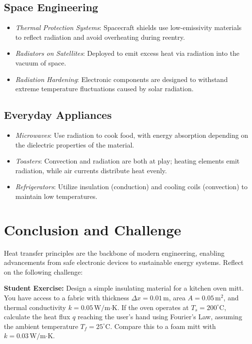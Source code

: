 \documentclass[12pt]{article}
\begin{document}
\subsection*{Space Engineering}
\begin{itemize}
    \item \textit{Thermal Protection Systems}: Spacecraft shields use low-emissivity materials to reflect radiation and avoid overheating during reentry.
    \item \textit{Radiators on Satellites}: Deployed to emit excess heat via radiation into the vacuum of space.
    \item \textit{Radiation Hardening}: Electronic components are designed to withstand extreme temperature fluctuations caused by solar radiation.
\end{itemize}

\subsection*{Everyday Appliances}
\begin{itemize}
    \item \textit{Microwaves}: Use radiation to cook food, with energy absorption depending on the dielectric properties of the material.
    \item \textit{Toasters}: Convection and radiation are both at play; heating elements emit radiation, while air currents distribute heat evenly.
    \item \textit{Refrigerators}: Utilize insulation (conduction) and cooling coils (convection) to maintain low temperatures.
\end{itemize}

\section*{Conclusion and Challenge}
Heat transfer principles are the backbone of modern engineering, enabling advancements from safe electronic devices to sustainable energy systems. Reflect on the following challenge: 

\textbf{Student Exercise:}
Design a simple insulating material for a kitchen oven mitt. You have access to a fabric with thickness $ \Delta x = 0.01 \, \text{m} $, area $ A = 0.05 \, \text{m}^2 $, and thermal conductivity $ k = 0.05 \, \text{W/m·K} $. If the oven operates at $ T_s = 200^\circ \text{C} $, calculate the heat flux $ q $ reaching the user's hand using Fourier's Law, assuming the ambient temperature $ T_f = 25^\circ \text{C} $. Compare this to a foam mitt with $ k = 0.03 \, \text{W/m·K} $.
\end{document}
